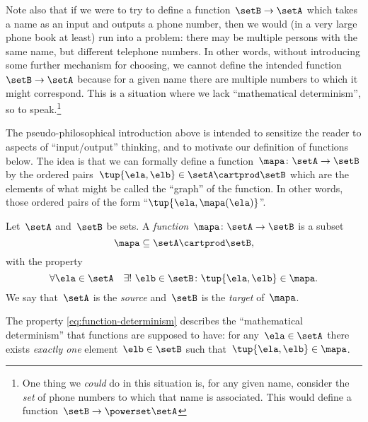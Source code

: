 Note also that if we were to try to define a function~$\setB \to \setA$ which takes a name as an input and outputs a phone number, then we would (in a very large phone book at least) run into a problem: there may be multiple persons with the same name, but different telephone numbers.
In other words, without introducing some further mechanism for choosing, we cannot define the intended function~$\setB \to \setA$ because for a given name there are multiple numbers to which it might correspond.
This is a situation where we lack ``mathematical determinism'', so to speak.\footnote{One thing we \emph{could} do in this situation is, for any given name, consider the \emph{set} of phone numbers to which that name is associated.
This would define a function~$\setB \to \powerset \setA$}

The pseudo-philosophical introduction above is intended to sensitize the reader to aspects of ``input/output'' thinking, and to motivate our definition of functions below.
The idea is that we can formally define a function~$\mapa\colon \setA \to \setB$ by the ordered pairs~$\tup{\ela, \elb} \in \setA \cartprod \setB$ which are the elements of what might be called the ``graph'' of the function.
In other words, those ordered pairs of the form ``$\tup{\ela, \mapa(\ela)}$''.

\begin{ctdefinition}
    \label{def:function}
    Let~$\setA$ and~$\setB$ be sets.
    A \emph{function}~$\mapa\colon \setA \to \setB$ is a subset
    \begin{equation*}
        \mapa \subseteq \setA \cartprod \setB,
    \end{equation*}
    with the property
    \begin{equation}
        \label{eq:function-determinism}
        \forall \ela \in \setA  \quad  \exists ! \ \elb \in \setB \colon \tup{\ela,\elb} \in \mapa.
    \end{equation}
    We say that~$\setA$ is the \emph{source} and~$\setB$ is the \emph{target} of~$\mapa$.
\end{ctdefinition}



The property \cref{eq:function-determinism} describes the ``mathematical determinism'' that functions are supposed to have: for any~$\ela \in \setA$ there exists \emph{exactly one} element~$\elb \in \setB$ such that~$\tup{\ela, \elb} \in \mapa$.

